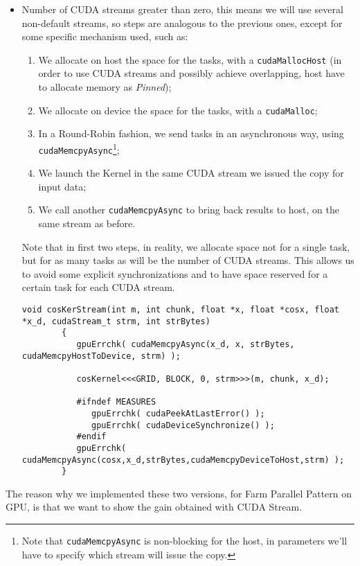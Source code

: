 \begin{itemize}
		\item Number of CUDA streams greater than zero, this means we will use several non-default streams, so steps are analogous to the previous ones, except for some specific mechanism used, such as:
		\begin{enumerate}
			\item We allocate on host the space for the tasks, with a \texttt{cudaMallocHost} (in order to use CUDA streams and possibly achieve overlapping, host have to allocate memory as \textit{Pinned});
			\item We allocate on device the space for the tasks, with a \texttt{cudaMalloc};
			\item In a Round-Robin fashion, we send tasks in an asynchronous way, using \texttt{cudaMemcpyAsync}\footnote{Note that \texttt{cudaMemcpyAsync} is non-blocking for the host, in parameters we'll have to specify which stream will issue the copy.};
			\item We launch the Kernel in the same CUDA stream we issued the copy for input data;
			\item We call another \texttt{cudaMemcpyAsync} to bring back results to host, on the same stream as before.
		\end{enumerate}
		Note that in first two steps, in reality, we allocate space not for a single task, but for as many tasks as will be the number of CUDA streams.
		This allows us to avoid some explicit synchronizations and to have space reserved for a certain task for each CUDA stream.
		\begin{lstlisting}[label=lst:str, caption={Data transfer host/device and kernel call, CUDA Streams version}]
		void cosKerStream(int m, int chunk, float *x, float *cosx, float *x_d, cudaStream_t strm, int strBytes)
		{     
		   gpuErrchk( cudaMemcpyAsync(x_d, x, strBytes, cudaMemcpyHostToDevice, strm) ); 
			
		   cosKernel<<<GRID, BLOCK, 0, strm>>>(m, chunk, x_d);
			
		   #ifndef MEASURES
			  gpuErrchk( cudaPeekAtLastError() );
			  gpuErrchk( cudaDeviceSynchronize() );
		   #endif   
		   gpuErrchk( cudaMemcpyAsync(cosx,x_d,strBytes,cudaMemcpyDeviceToHost,strm) );
		}
		\end{lstlisting}
		
	\end{itemize}
	The reason why we implemented these two versions, for Farm Parallel Pattern on GPU, is that we want to show the gain obtained with CUDA Stream.\\
